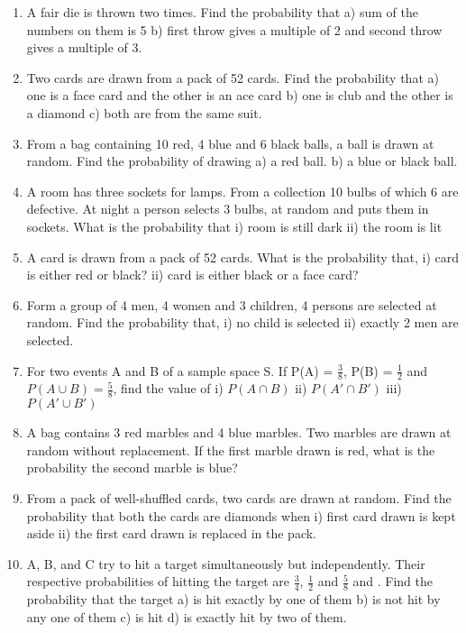 \documentclass[14pt]{article}
\begin{document}
\begin{multicols}{2}
\begin{enumerate}[resume]
\item A fair die is thrown two times. Find the
probability that a)	 sum of the numbers on them is 5
b)	 first throw gives a multiple of 2 and
second throw gives a multiple of 3.
\item Two cards are drawn from a pack of 52
cards. Find the probability that a)	 one is a face card and the other is an ace card
b)	 one is club and the other is a diamond
c)	 both are from the same suit.
\item From a bag containing 10 red, 4 blue and
6 black balls, a ball is drawn at random. Find
the probability of drawing
a)	 a red ball. b)	 a blue or black ball.

\item A room has three sockets for lamps. From a
collection 10 bulbs of which 6 are defective.
At night a person selects 3 bulbs, at random
and puts them in sockets. What is the
probability that i) room is still dark ii) the
room is lit

\item A card is drawn from a pack of 52 cards.
What is the probability that,
i)	 card is either red or black?	
ii)	 card is either black or a face card?

\item Form a group of 4 men, 4 women and
3 children, 4 persons are selected at random.
Find the probability that, i) no child is
selected ii) exactly 2 men are selected.

\item For two events A and B of a sample space S. If P(A) = $\frac{3}{8}$, P(B) = $\frac{1}{2}$ and $P(A\cup B)=\frac{5}{8}$, find the value of 
 i) $P (A\cap B)$ ii) $P(A' \cap B')$
iii) $ P(A' \cup B')$

\item A bag contains 3 red marbles and 4 blue
marbles. Two marbles are drawn at random
without replacement. If the first marble
drawn is red, what is the probability the
second marble is blue?

\item From a pack of well-shuffled cards, two cards
are drawn at random. Find the probability
that both the cards are diamonds when i)	 first card drawn is kept aside  ii)	 the first card drawn is replaced in the pack.

\item A, B, and C try to hit a target simultaneously
but independently. Their respective
probabilities of hitting the target are  $\frac{3}{4}$, $\frac{1}{2}$ and $\frac{5}{8}$ and . Find the probability that the target a) is hit exactly by one of them b) is not hit by any one of them
c) is hit d) is exactly hit by two of them.


\end{enumerate}
\end{multicols}
\end{document}

